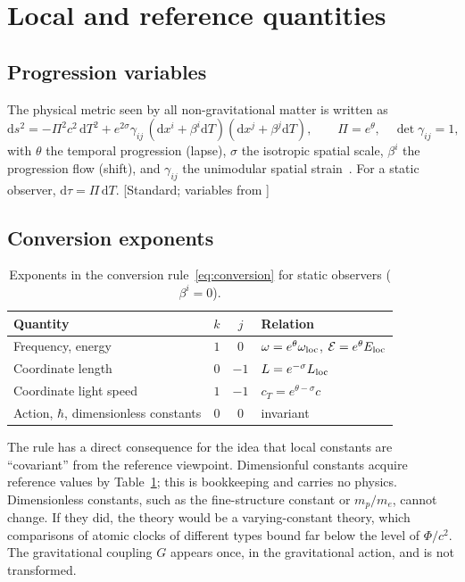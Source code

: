 \documentclass[11pt]{article}
\newcommand{\Pg}{\Pi}                 %
\newcommand{\thP}{\theta}             %
\newcommand{\sgP}{\sigma}             %
\newcommand{\Eloc}{E_{\rm loc}}       %
\newcommand{\Eref}{\mathcal{E}}       %
\newcommand{\dd}{\mathrm{d}}
\newcommand{\Tref}{T}                 %
\newcommand{\st}[1]{\textsf{\small[#1]}}
\theoremstyle{plain}
\theoremstyle{definition}
\theoremstyle{remark}
\begin{document}
\section{Local and reference quantities}
\label{sec:dictionary}

\subsection{Progression variables}

The physical metric seen by all non-gravitational matter is written as
\begin{equation}
\dd s^2 = -\Pg^2c^2\,\dd\Tref^2 + e^{2\sgP}\gamma_{ij}\,(\dd x^i+\beta^i\dd\Tref)(\dd x^j+\beta^j\dd\Tref),
\qquad \Pg=e^{\thP},\quad \det\gamma_{ij}=1,
\label{eq:metric}
\end{equation}
with $\thP$ the temporal progression (lapse), $\sgP$ the isotropic spatial scale, $\beta^i$ the progression flow (shift), and $\gamma_{ij}$ the unimodular spatial strain~\cite{JordanGeometry}. For a static observer, $\dd\tau=\Pg\,\dd\Tref$. \st{Standard; variables from \cite{JordanGeometry}}

\subsection{Conversion exponents}

\begin{table}[h]
\centering
\begin{tabular}{@{}lccl@{}}
\toprule
Quantity & $k$ & $j$ & Relation \\
\midrule
Frequency, energy & $1$ & $0$ & $\omega=e^{\thP}\omega_{\rm loc}$,\; $\Eref=e^{\thP}\Eloc$ \\
Coordinate length & $0$ & $-1$ & $L=e^{-\sgP}L_{\rm loc}$ \\
Coordinate light speed & $1$ & $-1$ & $c_{\Tref}=e^{\thP-\sgP}c$ \\
Action, $\hbar$, dimensionless constants & $0$ & $0$ & invariant \\
\bottomrule
\end{tabular}
\caption{Exponents in the conversion rule~\eqref{eq:conversion} for static observers ($\beta^i=0$).}
\label{tab:exponents}
\end{table}

The rule has a direct consequence for the idea that local constants are ``covariant'' from the reference viewpoint. Dimensionful constants acquire reference values by Table~\ref{tab:exponents}; this is bookkeeping and carries no physics. Dimensionless constants, such as the fine-structure constant or $m_p/m_e$, cannot change. If they did, the theory would be a varying-constant theory, which comparisons of atomic clocks of different types bound far below the level of $\Phi/c^2$. The gravitational coupling $G$ appears once, in the gravitational action, and is not transformed.
\end{document}
